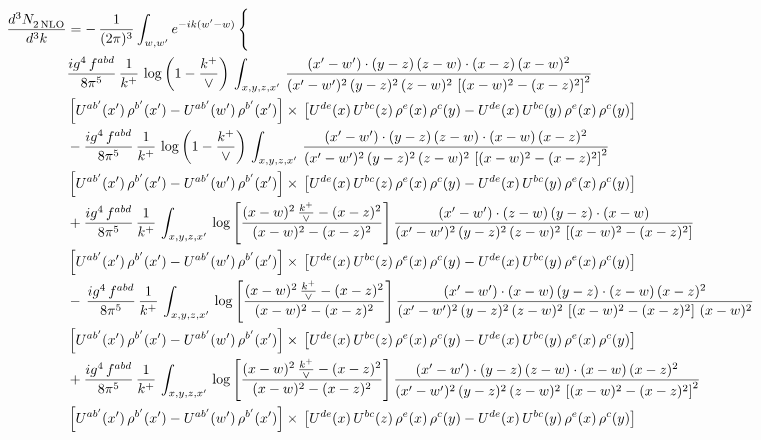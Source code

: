 \documentclass[10pt]{article}
\numberwithin{equation}{section}
\begin{document}
\begin{align}
   \frac{d^{3}N_{2\,\rm NLO}^{\rm}}{d^{3}k}  & =  -\,\frac{1}{(2\pi)^{3}}  \int_{w, w^\prime} e^{-ik(w^\prime-w)}\, \Bigg\{\notag \\ &  \frac{ig^{4}\, f^{abd}}{8\pi^{5}}\, \frac{1}{k^{+}}\,\log{\left(1-\frac{k^{+}}{\vee}\right)}\, \int_{x,y,z,x'}\,\frac{(x'-w')\cdot  (y-z)\, (z-w)\cdot (x-z)\, (x-w)^{2}}{(x'-w')^{2}\, (y-z)^{2}\, (z-w)^{2}\,\left[(x-w)^{2}-(x-z)^{2}\right]^{2}}\, \notag \\ & \left[U^{ab'}(x')\,\rho^{b'}(x')-U^{ab'}(w')\, \rho^{b'}(x')\right]\times\,\left[U^{de}(x)\,U^{bc}(z)\, \rho^{e}(x)\,\rho^{c}(y)-U^{de}(x)\,U^{bc}(y)\,\rho^{e}(x)\,\rho^{c}(y)\right] \notag \\ &   - \frac{ig^{4}\, f^{abd}}{8\pi^{5}}\, \frac{1}{k^{+}}\,\log{\left(1-\frac{k^{+}}{\vee}\right)}\, \int_{x,y,z,x'}\,\frac{(x'-w')\cdot  (y-z)\, (z-w)\cdot (x-w)\, (x-z)^{2}}{(x'-w')^{2}\, (y-z)^{2}\, (z-w)^{2}\,\left[(x-w)^{2}-(x-z)^{2}\right]^{2}}\, \notag \\ & \left[U^{ab'}(x')\,\rho^{b'}(x')-U^{ab'}(w')\, \rho^{b'}(x')\right]\times\,\left[U^{de}(x)\,U^{bc}(z)\, \rho^{e}(x)\,\rho^{c}(y)-U^{de}(x)\,U^{bc}(y)\,\rho^{e}(x)\,\rho^{c}(y)\right] \notag \\
&  + \frac{ig^{4}\, f^{abd}}{8\pi^{5}}\, \frac{1}{k^{+}}\, \int_{x,y,z,x'}\,\log{\left[\frac{(x-w)^{2}\,\frac{k^{+}}{\vee}-(x-z)^{2}}{(x-w)^{2}-(x-z)^{2}}\right]}\,\frac{(x'-w')\cdot (z-w)\, (y-z)\cdot (x-w)}{(x'-w')^{2}\, (y-z)^{2}\, (z-w)^{2}\,\left[(x-w)^{2}-(x-z)^{2}\right]}\, \notag \\ & \left[U^{ab'}(x')\,\rho^{b'}(x')-U^{ab'}(w')\, \rho^{b'}(x')\right]\times\,\left[U^{de}(x)\,U^{bc}(z)\, \rho^{e}(x)\,\rho^{c}(y)-U^{de}(x)\,U^{bc}(y)\,\rho^{e}(x)\,\rho^{c}(y)\right] \notag \\
& -\,\frac{ig^{4}\, f^{abd}}{8\pi^{5}}\, \frac{1}{k^{+}}\, \int_{x,y,z,x'}\,\log{\left[\frac{(x-w)^{2}\,\frac{k^{+}}{\vee}-(x-z)^{2}}{(x-w)^{2}-(x-z)^{2}}\right]}\,\frac{(x'-w')\cdot (x-w)\, (y-z)\cdot(z-w)\,(x-z)^{2}}{(x'-w')^{2}\, (y-z)^{2}\, (z-w)^{2}\,\left[(x-w)^{2}-(x-z)^{2}\right]\,(x-w)^{2}}\, \notag \\ & \left[U^{ab'}(x')\,\rho^{b'}(x')-U^{ab'}(w')\, \rho^{b'}(x')\right]\times\,\left[U^{de}(x)\,U^{bc}(z)\, \rho^{e}(x)\,\rho^{c}(y)-U^{de}(x)\,U^{bc}(y)\,\rho^{e}(x)\,\rho^{c}(y)\right] \notag \\
& +\frac{ig^{4}\, f^{abd}}{8\pi^{5}}\, \frac{1}{k^{+}}\, \int_{x,y,z,x'}\,\log{\left[\frac{(x-w)^{2}\,\frac{k^{+}}{\vee}-(x-z)^{2}}{(x-w)^{2}-(x-z)^{2}}\right]}\,\frac{(x'-w')\cdot  (y-z)\, (z-w)\cdot (x-w)\, (x-z)^{2}}{(x'-w')^{2}\, (y-z)^{2}\, (z-w)^{2}\,\left[(x-w)^{2}-(x-z)^{2}\right]^{2}}\, \notag \\ & \left[U^{ab'}(x')\,\rho^{b'}(x')-U^{ab'}(w')\, \rho^{b'}(x')\right]\times\,\left[U^{de}(x)\,U^{bc}(z)\, \rho^{e}(x)\,\rho^{c}(y)-U^{de}(x)\,U^{bc}(y)\,\rho^{e}(x)\,\rho^{c}(y)\right] \notag \\

\end{align}
\end{document}
